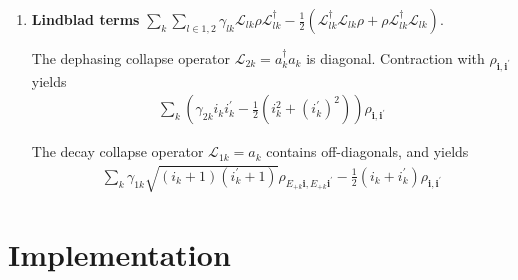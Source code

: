 \documentclass[letterpaper]{article}
\newcommand{\Ell}{\mathcal{L}}
\newcommand{\bfi}{\boldsymbol{i}}
\begin{document}
\begin{enumerate}
    \item \textbf{Lindblad terms} $\sum_k \sum_{l\in{1,2}} \gamma_{lk} \Ell_{lk}
      \rho \Ell_{lk}^\dag - \frac{1}{2} \left( \Ell_{lk}^\dag \Ell_{lk} \rho +
      \rho \Ell_{lk}^\dag \Ell_{lk}\right)$.
    
    The dephasing collapse operator $\Ell_{2k} = a_k^\dag a_k$ is diagonal.
    Contraction with $\rho_{\bfi,\bfi^\prime}$ yields
    \begin{align}
        \sum_k \left( \gamma_{2k} i_ki_k^\prime - \frac 12 \left( i_k^2 +
        (i_k^\prime)^2\right) \right) \rho_{\bfi,\bfi^\prime}
    \end{align}

    The decay collapse operator $\Ell_{1k} = a_k$ contains off-diagonals, and
    yields
    \begin{align}
        \sum_k \gamma_{1k} \sqrt{(i_k+1)(i_k^\prime+1)} \rho_{E_{+k}\bfi,
        E_{+k}\bfi^\prime} - \frac 12 \left( i_k+ i_k^\prime \right)\rho_{\bfi,
        \bfi^\prime} 
    \end{align}
      
\end{enumerate}

\section{Implementation}
\end{document}

